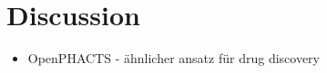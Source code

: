 
\chapter{Discussion}
\label{cha:discussion}

\begin{itemize}
\item OpenPHACTS - ähnlicher ansatz für drug discovery
\end{itemize}

